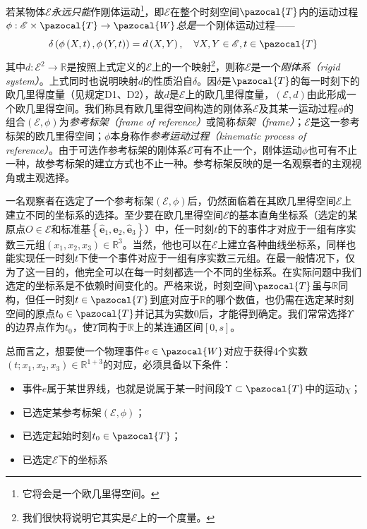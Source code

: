 \documentclass[main.tex]{subfiles}
\begin{document}
若某物体$\mathcal{E}$\emph{永远只能}作刚体运动\footnote{它将会是一个欧几里得空间。}，即$\mathcal{E}$在整个时刻空间$\pazocal{T}$内的运动过程$\phi:\mathcal{E}\times\pazocal{T}\rightarrow\pazocal{W}$\emph{总是}一个刚体运动过程——
\[\delta\left(\phi\left(X,t\right),\phi\left(Y,t\right)\right)=d\left(X,Y\right),\quad\forall X,Y\in\mathcal{E},t\in\pazocal{T}\]
其中$d:\mathcal{E}^2\rightarrow\mathbb R$是按照上式定义的$\mathcal{E}$上的一个映射\footnote{我们很快将说明它其实是$\mathcal{E}$上的一个度量。}，则称$\mathcal{E}$是一个\emph{刚体系（rigid system）}。上式同时也说明映射$d$的性质沿自$\delta$。因$\delta$是$\pazocal{T}$的每一时刻下的欧几里得度量（见规定D1、D2），故$d$是$\mathcal{E}$上的欧几里得度量，$\left(\mathcal{E},d\right)$由此形成一个欧几里得空间。我们称具有欧几里得空间构造的刚体系$\mathcal{E}$及其某一运动过程$\phi$的组合$\left(\mathcal{E},\phi\right)$为\emph{参考标架（frame of reference）}或简称\emph{标架（frame）}；$\mathcal{E}$是这一参考标架的欧几里得空间；$\phi$本身称作\emph{参考运动过程（kinematic process of reference）}。由于可选作参考标架的刚体系$\mathcal{E}$可有不止一个，刚体运动$\phi$也可有不止一种，故参考标架的建立方式也不止一种。参考标架反映的是一名观察者的主观视角或主观选择。

一名观察者在选定了一个参考标架$\left(\mathcal{E},\phi\right)$后，仍然面临着在其欧几里得空间$\mathcal{E}$上建立不同的坐标系的选择。至少要在欧几里得空间$\mathcal{E}$的基本直角坐标系（选定的某原点$O\in\mathcal{E}$和标准基$\left\{\mathbf{\hat{e}}_1,\mathbf{\hat{e}}_2,\mathbf{\hat{e}}_3\right\}$）中，任一时刻$t$的下的事件才对应于一组有序实数三元组$\left(x_1,x_2,x_3\right)\in\mathbb{R}^3$。当然，他也可以在$\mathcal{E}$上建立各种曲线坐标系，同样也能实现任一时刻$t$下使一个事件对应于一组有序实数三元组。在最一般情况下，仅为了这一目的，他完全可以在每一时刻都选一个不同的坐标系。在实际问题中我们选定的坐标系是不依赖时间变化的。严格来说，时刻空间$\pazocal{T}$虽与$\mathbb{R}$同构，但任一时刻$t\in\pazocal{T}$到底对应于$\mathbb{R}$的哪个数值，也仍需在选定某时刻空间的原点$t_0\in\pazocal{T}$并记其为实数$0$后，才能得到确定。我们常常选择$\Upsilon$的边界点作为$t_0$，使$\Upsilon$同构于$\mathbb{R}$上的某连通区间$\left[0,s\right]$。

总而言之，想要使一个物理事件$e\in\pazocal{W}$对应于获得4个实数$\left(t;x_1,x_2,x_3\right)\in\mathbb{R}^{1+3}$的对应，必须具备以下条件：
\begin{itemize}
      \item 事件$e$属于某世界线，也就是说属于某一时间段$\Upsilon\subset\pazocal{T}$中的运动$\chi$；
      \item 已选定某参考标架$\left(\mathcal{E},\phi\right)$；
      \item 已选定起始时刻$t_0\in\pazocal{T}$；
      \item 已选定$\mathcal{E}$下的坐标系
\end{itemize}
\end{document}

